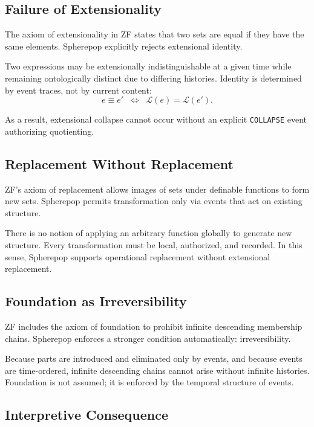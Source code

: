 \documentclass[11pt]{article}
\begin{document}
\subsection{Failure of Extensionality}

The axiom of extensionality in ZF states that two sets are equal if they have the same elements. Spherepop explicitly rejects extensional identity.

Two expressions may be extensionally indistinguishable at a given time while remaining ontologically distinct due to differing histories. Identity is determined by event traces, not by current content:
\[
e \equiv e' \;\;\Longleftrightarrow\;\; \mathcal{L}(e) = \mathcal{L}(e').
\]

As a result, extensional collapse cannot occur without an explicit \texttt{COLLAPSE} event authorizing quotienting.

\subsection{Replacement Without Replacement}

ZF’s axiom of replacement allows images of sets under definable functions to form new sets. Spherepop permits transformation only via events that act on existing structure.

There is no notion of applying an arbitrary function globally to generate new structure. Every transformation must be local, authorized, and recorded. In this sense, Spherepop supports operational replacement without extensional replacement.

\subsection{Foundation as Irreversibility}

ZF includes the axiom of foundation to prohibit infinite descending membership chains. Spherepop enforces a stronger condition automatically: irreversibility.

Because parts are introduced and eliminated only by events, and because events are time-ordered, infinite descending chains cannot arise without infinite histories. Foundation is not assumed; it is enforced by the temporal structure of events.

\subsection{Interpretive Consequence}
\end{document}

